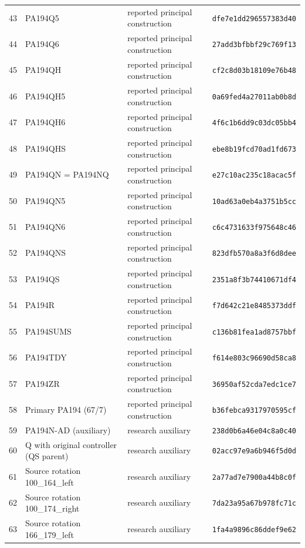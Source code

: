 \begin{longtable}{p{.06\linewidth}>{\raggedright\arraybackslash}p{.30\linewidth}>{\raggedright\arraybackslash}p{.21\linewidth}p{.31\linewidth}}
43 & PA194Q5 & reported principal construction & \texttt{dfe7e1dd296557383d40} \\
44 & PA194Q6 & reported principal construction & \texttt{27add3bfbbf29c769f13} \\
45 & PA194QH & reported principal construction & \texttt{cf2c8d03b18109e76b48} \\
46 & PA194QH5 & reported principal construction & \texttt{0a69fed4a27011ab0b8d} \\
47 & PA194QH6 & reported principal construction & \texttt{4f6c1b6dd9c03dc05bb4} \\
48 & PA194QHS & reported principal construction & \texttt{ebe8b19fcd70ad1fd673} \\
49 & PA194QN = PA194NQ & reported principal construction & \texttt{e27c10ac235c18acac5f} \\
50 & PA194QN5 & reported principal construction & \texttt{10ad63a0eb4a3751b5cc} \\
51 & PA194QN6 & reported principal construction & \texttt{c6c4731633f975648c46} \\
52 & PA194QNS & reported principal construction & \texttt{823dfb570a8a3f6d8dee} \\
53 & PA194QS & reported principal construction & \texttt{2351a8f3b74410671df4} \\
54 & PA194R & reported principal construction & \texttt{f7d642c21e8485373ddf} \\
55 & PA194SUMS & reported principal construction & \texttt{c136b81fea1ad8757bbf} \\
56 & PA194TDY & reported principal construction & \texttt{f614e803c96690d58ca8} \\
57 & PA194ZR & reported principal construction & \texttt{36950af52cda7edc1ce7} \\
58 & Primary PA194 (67/7) & reported principal construction & \texttt{b36febca9317970595cf} \\
59 & PA194N-AD (auxiliary) & research auxiliary & \texttt{238d0b6a46e04c8a0c40} \\
60 & Q with original controller (QS parent) & research auxiliary & \texttt{02acc97e9a6b946f5d0d} \\
61 & Source rotation 100\_164\_left & research auxiliary & \texttt{2a77ad7e7900a44b8c0f} \\
62 & Source rotation 100\_174\_right & research auxiliary & \texttt{7da23a95a67b978fc71c} \\
63 & Source rotation 166\_179\_left & research auxiliary & \texttt{1fa4a9896c86ddef9e62} \\

\end{longtable}
